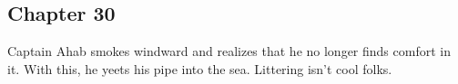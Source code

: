 \subsection{Chapter 30}

Captain Ahab smokes windward and realizes that he no longer finds comfort in
it. With this, he yeets his pipe into the sea. Littering isn't cool folks.
